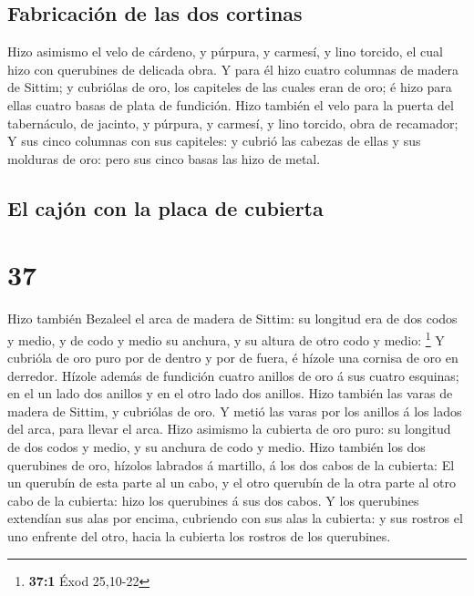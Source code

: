 \hypertarget{fabricaciuxf3n-de-las-dos-cortinas}{%
\subsection{Fabricación de las dos
cortinas}\label{fabricaciuxf3n-de-las-dos-cortinas}}

 Hizo asimismo el velo de cárdeno, y púrpura, y carmesí, y
lino torcido, el cual hizo con querubines de delicada obra.
 Y para él hizo cuatro columnas de madera de Sittim; y
cubriólas de oro, los capiteles de las cuales eran de oro; é hizo para
ellas cuatro basas de plata de fundición.  Hizo también el
velo para la puerta del tabernáculo, de jacinto, y púrpura, y carmesí, y
lino torcido, obra de recamador;  Y sus cinco columnas con
sus capiteles: y cubrió las cabezas de ellas y sus molduras de oro: pero
sus cinco basas las hizo de metal.

\hypertarget{el-cajuxf3n-con-la-placa-de-cubierta}{%
\subsection{El cajón con la placa de
cubierta}\label{el-cajuxf3n-con-la-placa-de-cubierta}}

\hypertarget{section-36}{%
\section{37}\label{section-36}}

 Hizo también Bezaleel el arca de madera de Sittim: su
longitud era de dos codos y medio, y de codo y medio su anchura, y su
altura de otro codo y medio: \footnote{\textbf{37:1} Éxod 25,10-22}
 Y cubrióla de oro puro por de dentro y por de fuera, é
hízole una cornisa de oro en derredor.  Hízole además de
fundición cuatro anillos de oro á sus cuatro esquinas; en el un lado dos
anillos y en el otro lado dos anillos.  Hizo también las
varas de madera de Sittim, y cubriólas de oro.  Y metió las
varas por los anillos á los lados del arca, para llevar el arca.
 Hizo asimismo la cubierta de oro puro: su longitud de dos
codos y medio, y su anchura de codo y medio.  Hizo también
los dos querubines de oro, hízolos labrados á martillo, á los dos cabos
de la cubierta:  El un querubín de esta parte al un cabo, y
el otro querubín de la otra parte al otro cabo de la cubierta: hizo los
querubines á sus dos cabos.  Y los querubines extendían sus
alas por encima, cubriendo con sus alas la cubierta: y sus rostros el
uno enfrente del otro, hacia la cubierta los rostros de los querubines.

